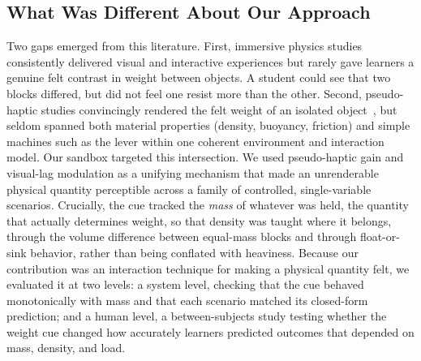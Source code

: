 \subsection{What Was Different About Our Approach}
Two gaps emerged from this literature. First, immersive physics studies consistently
delivered visual and interactive experiences but rarely gave learners a genuine felt
contrast in weight between objects. A student could see that two blocks differed, but
did not feel one resist more than the other. Second, pseudo-haptic studies
convincingly rendered the felt weight of an isolated
object~\cite{dominjon2005influence, rietzler2018breaking}, but seldom spanned both
material properties (density, buoyancy, friction) and simple machines such as the
lever within one coherent environment and interaction model. Our sandbox targeted
this intersection. We used pseudo-haptic gain and visual-lag modulation as a unifying
mechanism that made an unrenderable physical quantity perceptible across a family of
controlled, single-variable scenarios. Crucially, the cue tracked the \emph{mass} of
whatever was held, the quantity that actually determines weight, so that density was
taught where it belongs, through the volume difference between equal-mass blocks and
through float-or-sink behavior, rather than being conflated with heaviness. Because
our contribution was an interaction technique for making a physical quantity felt, we
evaluated it at two levels: a system level, checking that the cue behaved
monotonically with mass and that each scenario matched its closed-form prediction;
and a human level, a between-subjects study testing whether the weight cue changed how
accurately learners predicted outcomes that depended on mass, density, and load.
